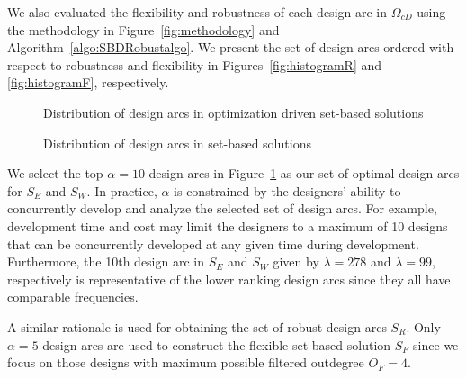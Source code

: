 We also evaluated the flexibility and robustness of each design arc in $\Omega_{cD}$ using the methodology in Figure~\ref{fig:methodology} and Algorithm~\ref{algo:SBDRobustalgo}. We present the set of design arcs ordered with respect to robustness and flexibility in Figures~\ref{fig:histogramR} and \ref{fig:histogramF}, respectively.

\begin{figure}[h!]
	\centering
	 \hspace{0.1\textwidth}%
	 \hspace{0.1\textwidth}%
	\caption{Distribution of design arcs in optimization driven set-based solutions}
	\label{fig:histogramplotsSBD}
\end{figure}

\begin{figure}[h!]
	\centering
	 \hspace{0.1\textwidth}%
	 \hspace{0.1\textwidth}%
	\caption{Distribution of design arcs in set-based solutions}
	\label{fig:histogramplots}
\end{figure}

We select the top $\alpha = 10$ design arcs in Figure~\ref{fig:histogramplotsSBD} as our set of optimal design arcs for $S_E$ and $S_W$. In practice, $\alpha$ is constrained by the designers' ability to concurrently develop and analyze the selected set of design arcs. For example, development time and cost may limit the designers to a maximum of 10 designs that can be concurrently developed at any given time during development. Furthermore, the 10th design arc in $S_E$ and $S_W$ given by $\lambda = 278$ and $\lambda = 99$, respectively is representative of the lower ranking design arcs since they all have comparable frequencies. 

A similar rationale is used for obtaining the set of robust design arcs $S_R$. Only $\alpha=5$ design arcs are used to construct the flexible set-based solution $S_F$ since we focus on those designs with maximum possible filtered outdegree $O_F = 4$.

